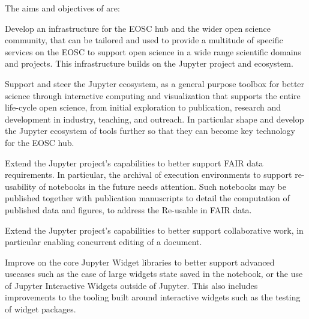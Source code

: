 

\noindent The aims and objectives of \TheProject are:
\begin{compactenum}

\item \label{aim:eosc}%
  Develop an infrastructure for the EOSC hub and the wider open
  science community, that can be tailored and used to provide a
  multitude of specific services on the EOSC to support open science
  in a wide range scientific domains and projects. This infrastructure
  builds on the Jupyter project and ecosystem.

\item \label{aim:jupyter}%
  Support and steer the Jupyter ecosystem, as a general purpose
  toolbox for better science through interactive computing and
  visualization that supports the entire life-cycle open science, from
  initial exploration to publication, research and development in
  industry, teaching, and outreach. In particular shape and develop
  the Jupyter ecosystem of tools further so that they can become key
  technology for the EOSC hub.

\item \label{aim:jupyter-reusability}%
  Extend the Jupyter project's capabilities to better support FAIR
  data requirements. In particular, the archival of execution
  environments to support re-usability of notebooks in the future
  needs attention. Such notebooks may be published together with
  publication manuscripts to detail the computation of published data
  and figures, to address the Re-usable in FAIR data.

\item \label{aim:jupyter-collaboration}%
  Extend the Jupyter project's capabilities to better support
  collaborative work, in particular enabling concurrent editing of a
  document.

\item \label{aim:jupyter-widgets}%
  Improve on the core Jupyter Widget libraries to better support advanced
  usecases such as the case of large widgets state saved in the notebook, or
  the use of Jupyter Interactive Widgets outside of Jupyter. This also includes
  improvements to the tooling built around interactive widgets such as the
  testing of widget packages.


\end{compactenum}

